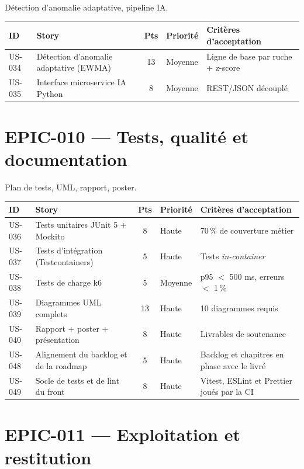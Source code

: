 Détection d'anomalie adaptative, pipeline IA.

\begin{center}
\begin{tabular}{lp{6.6cm}cl p{4.6cm}}
\toprule
\textbf{ID} & \textbf{Story} & \textbf{Pts} & \textbf{Priorité} & \textbf{Critères d'acceptation} \\
\midrule
US-034 & Détection d'anomalie adaptative (EWMA) & 13 & Moyenne & Ligne de base par ruche + z-score \\
US-035 & Interface microservice IA Python       & 8  & Moyenne & REST/JSON découplé \\
\bottomrule
\end{tabular}
\end{center}

\section{EPIC-010 --- Tests, qualité et documentation}

Plan de tests, UML, rapport, poster.

\begin{center}
\begin{tabular}{lp{6.6cm}cl p{4.6cm}}
\toprule
\textbf{ID} & \textbf{Story} & \textbf{Pts} & \textbf{Priorité} & \textbf{Critères d'acceptation} \\
\midrule
US-036 & Tests unitaires JUnit 5 + Mockito   & 8  & Haute   & 70\,\% de couverture métier \\
US-037 & Tests d'intégration (Testcontainers)    & 5  & Haute   & Tests \emph{in-container} \\
US-038 & Tests de charge k6                  & 5  & Moyenne & p95 $<$ 500 ms, erreurs $<$ 1\,\% \\
US-039 & Diagrammes UML complets             & 13 & Haute   & 10 diagrammes requis \\
US-040 & Rapport + poster + présentation     & 8  & Haute   & Livrables de soutenance \\
US-048 & Alignement du backlog et de la roadmap & 5 & Haute  & Backlog et chapitres en phase avec le livré \\
US-049 & Socle de tests et de lint du front  & 8  & Haute   & Vitest, ESLint et Prettier joués par la CI \\
\bottomrule
\end{tabular}
\end{center}

\section{EPIC-011 --- Exploitation et restitution}

